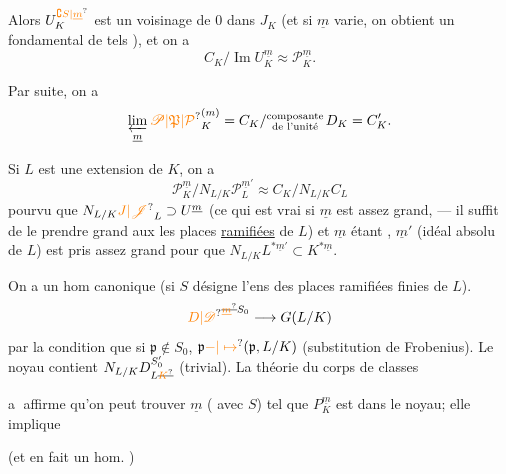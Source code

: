 Alors $U_K^{\unsure{\complement S|\underline m}}$ est un voisinage  de $0$ dans $J_K$ (et si $\underline m$ varie, on obtient un  fondamental de tels ), et  on a
\[
C_K/\operatorname{Im}U_K^{\underline m}\approx\mathscr{P}_K^{\underline m}.
\]

Par suite, on a
\[
\varprojlim_{\underline m}{\unsure{\mathscr{P}|\mathfrak{P}|\mathcal{P}}}_K^{(m)}=C_K/\substack{\text{composante}\\\text{de l'unité}}\,D_K=C'_K.
\]

Si $L$ est une extension   de $K$, on a
\[
\mathscr{P}_K^{\underline m}/N_{L/K}\mathscr{P}_L^{\underline m'}\approx C_K/N_{L/K}C_L
\]
pourvu que $N_{L/K}{\unsure{J|\mathscr{J}}}_L\supset U^{\underline m}$ (ce qui est vrai si $\underline m$ est assez grand, --- il suffit de le prendre grand  aux  les places \uline{ramifiées} de $L$) et $\underline m$ étant , $\underline m'$ (idéal absolu de $L$) est pris assez grand pour que $N_{L/K}L^{*\underline m'}\subset K^{*\underline m}$.

 On a un hom canonique (si $S$ désigne l'ens des places  ramifiées finies de $L$).
\[
{\unsure{D|\mathscr{D}}}^{\deleted{\unsure{\underline m}}S_0}\longrightarrow G(L/K)
\]
par la condition que si $\mathfrak p\notin S_0$, $\mathfrak p\unsure{-|\mapsto}(\mathfrak p,L/K)$ (substitution de Frobenius). Le noyau contient  $N_{L/K}D_{L\deleted{\unsure{K}}}^{S'_0}$ (trivial). La théorie du corps de classes

\textcircled{a} affirme qu'on peut trouver $\underline m$ ( avec $S$) tel que  $P_K^{\underline m}$ est dans le noyau; elle implique

(et en fait un hom.
)

